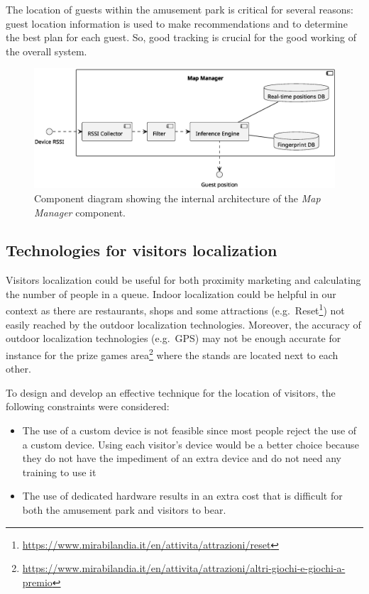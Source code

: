 The location of guests within the amusement park is critical for several reasons: guest location information is used to make recommendations and to determine the best plan for each guest. So, good tracking is crucial for the good working of the overall system.

\begin{figure}[H]
	\centering
	\includegraphics[width=\textwidth]{img/map-manager.eps}
	\caption{Component diagram showing the internal architecture of the \textit{Map Manager} component.
	}
	\label{fig:map-manager}
\end{figure}

\subsection{Technologies for visitors localization}\label{sec:technologies}
Visitors localization could be useful for both proximity marketing and calculating the number of people in a queue.
Indoor localization could be helpful in our context as there are restaurants, shops and some attractions
(e.g.\ Reset\footnote{\url{https://www.mirabilandia.it/en/attivita/attrazioni/reset}}) not easily reached by the outdoor localization technologies.
Moreover, the accuracy of outdoor localization technologies (e.g.\ GPS) may not be enough accurate for instance for the prize games area\footnote{\url{https://www.mirabilandia.it/en/attivita/attrazioni/altri-giochi-e-giochi-a-premio}}
where the stands are located next to each other.

To design and develop an effective technique for the location of visitors, the following constraints were considered:
\begin{itemize}
	\item The use of a custom device is not feasible since most people reject the use of a custom device. Using each visitor's device would
	      be a better choice because they do not have the impediment of an extra device and do not need any training to use it
	\item The use of dedicated hardware results in an extra cost that is difficult for both the amusement park and visitors to bear.
\end{itemize}

